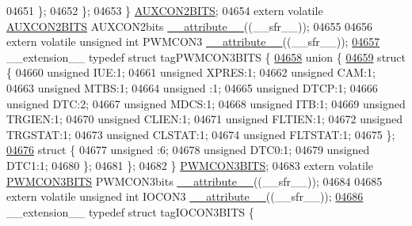 \begin{DoxyCode}
04651     \};
04652   \};
04653 \} \hyperlink{a00014_d8/d87/a00118}{AUXCON2BITS};
04654 \textcolor{keyword}{extern} \textcolor{keyword}{volatile} \hyperlink{a00014_d8/d87/a00118}{AUXCON2BITS} AUXCON2bits \hyperlink{a00015_a493c46f03454991ccc5aa7a6e1dfb2a7}{\_\_attribute\_\_}((\_\_sfr\_\_));
04655 
04656 \textcolor{keyword}{extern} \textcolor{keyword}{volatile} \textcolor{keywordtype}{unsigned} \textcolor{keywordtype}{int}  PWMCON3 \hyperlink{a00015_a493c46f03454991ccc5aa7a6e1dfb2a7}{\_\_attribute\_\_}((\_\_sfr\_\_));
\hypertarget{a00015_source_l04657}{}\hyperlink{a00014}{04657} \_\_extension\_\_ \textcolor{keyword}{typedef} \textcolor{keyword}{struct }tagPWMCON3BITS \{
\hypertarget{a00015_source_l04658}{}\hyperlink{a00015}{04658}   \textcolor{keyword}{union }\{
\hypertarget{a00015_source_l04659}{}\hyperlink{a00015}{04659}     \textcolor{keyword}{struct }\{
04660       \textcolor{keywordtype}{unsigned} IUE:1;
04661       \textcolor{keywordtype}{unsigned} XPRES:1;
04662       \textcolor{keywordtype}{unsigned} CAM:1;
04663       \textcolor{keywordtype}{unsigned} MTBS:1;
04664       \textcolor{keywordtype}{unsigned} :1;
04665       \textcolor{keywordtype}{unsigned} DTCP:1;
04666       \textcolor{keywordtype}{unsigned} DTC:2;
04667       \textcolor{keywordtype}{unsigned} MDCS:1;
04668       \textcolor{keywordtype}{unsigned} ITB:1;
04669       \textcolor{keywordtype}{unsigned} TRGIEN:1;
04670       \textcolor{keywordtype}{unsigned} CLIEN:1;
04671       \textcolor{keywordtype}{unsigned} FLTIEN:1;
04672       \textcolor{keywordtype}{unsigned} TRGSTAT:1;
04673       \textcolor{keywordtype}{unsigned} CLSTAT:1;
04674       \textcolor{keywordtype}{unsigned} FLTSTAT:1;
04675     \};
\hypertarget{a00015_source_l04676}{}\hyperlink{a00015}{04676}     \textcolor{keyword}{struct }\{
04677       \textcolor{keywordtype}{unsigned} :6;
04678       \textcolor{keywordtype}{unsigned} DTC0:1;
04679       \textcolor{keywordtype}{unsigned} DTC1:1;
04680     \};
04681   \};
04682 \} \hyperlink{a00014_d3/db4/a00684}{PWMCON3BITS};
04683 \textcolor{keyword}{extern} \textcolor{keyword}{volatile} \hyperlink{a00014_d3/db4/a00684}{PWMCON3BITS} PWMCON3bits \hyperlink{a00015_a493c46f03454991ccc5aa7a6e1dfb2a7}{\_\_attribute\_\_}((\_\_sfr\_\_));
04684 
04685 \textcolor{keyword}{extern} \textcolor{keyword}{volatile} \textcolor{keywordtype}{unsigned} \textcolor{keywordtype}{int}  IOCON3 \hyperlink{a00015_a493c46f03454991ccc5aa7a6e1dfb2a7}{\_\_attribute\_\_}((\_\_sfr\_\_));
\hypertarget{a00015_source_l04686}{}\hyperlink{a00014}{04686} \_\_extension\_\_ \textcolor{keyword}{typedef} \textcolor{keyword}{struct }tagIOCON3BITS \{

\end{DoxyCode}
